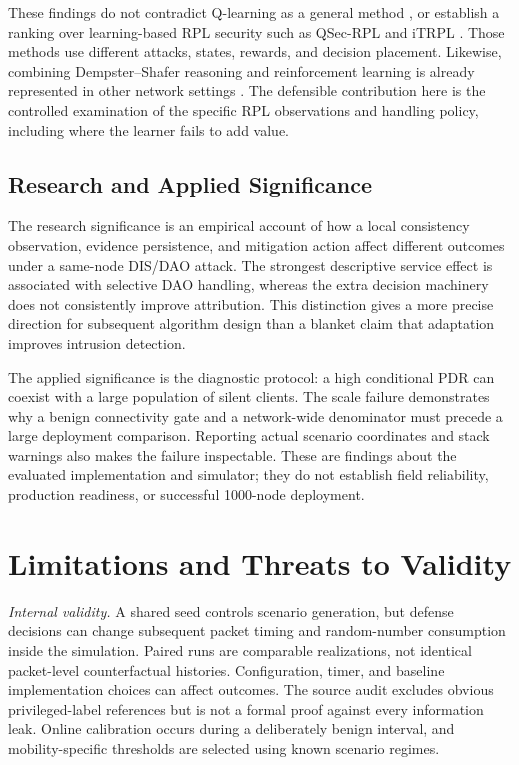 These findings do not contradict Q-learning as a general method \cite{watkins1992}, or establish a ranking over learning-based RPL security such as QSec-RPL and iTRPL \cite{qsecrpl2023,itrpl2024}. Those methods use different attacks, states, rewards, and decision placement. Likewise, combining Dempster--Shafer reasoning and reinforcement learning is already represented in other network settings \cite{gyawali2021,jasti2024}. The defensible contribution here is the controlled examination of the specific RPL observations and handling policy, including where the learner fails to add value.

\subsection{Research and Applied Significance}
The research significance is an empirical account of how a local consistency observation, evidence persistence, and mitigation action affect different outcomes under a same-node DIS/DAO attack. The strongest descriptive service effect is associated with selective DAO handling, whereas the extra decision machinery does not consistently improve attribution. This distinction gives a more precise direction for subsequent algorithm design than a blanket claim that adaptation improves intrusion detection.

The applied significance is the diagnostic protocol: a high conditional PDR can coexist with a large population of silent clients. The scale failure demonstrates why a benign connectivity gate and a network-wide denominator must precede a large deployment comparison. Reporting actual scenario coordinates and stack warnings also makes the failure inspectable. These are findings about the evaluated implementation and simulator; they do not establish field reliability, production readiness, or successful 1000-node deployment.

\section{Limitations and Threats to Validity}\label{sec:limitations}
\textit{Internal validity.} A shared seed controls scenario generation, but defense decisions can change subsequent packet timing and random-number consumption inside the simulation. Paired runs are comparable realizations, not identical packet-level counterfactual histories. Configuration, timer, and baseline implementation choices can affect outcomes. The source audit excludes obvious privileged-label references but is not a formal proof against every information leak. Online calibration occurs during a deliberately benign interval, and mobility-specific thresholds are selected using known scenario regimes.

